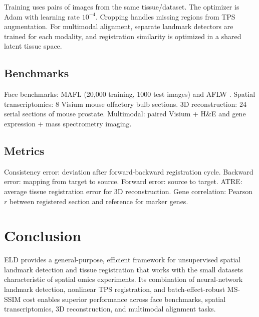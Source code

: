 \documentclass[11pt]{article}
\begin{document}
Training uses pairs of images from the same tissue/dataset. The optimizer is Adam \citep{kingma2014adam} with learning rate $10^{-4}$. Cropping handles missing regions from TPS augmentation. For multimodal alignment, separate landmark detectors are trained for each modality, and registration similarity is optimized in a shared latent tissue space.

\subsection{Benchmarks}

Face benchmarks: MAFL \citep{mafl2015deep} (20,000 training, 1000 test images) and AFLW \citep{koestinger2011aflw}. Spatial transcriptomics: 8 Visium mouse olfactory bulb sections. 3D reconstruction: 24 serial sections of mouse prostate. Multimodal: paired Visium + H\&E and gene expression + mass spectrometry imaging.

\subsection{Metrics}

Consistency error: deviation after forward-backward registration cycle. Backward error: mapping from target to source. Forward error: source to target. ATRE: average tissue registration error for 3D reconstruction. Gene correlation: Pearson $r$ between registered section and reference for marker genes.

\section{Conclusion}

ELD provides a general-purpose, efficient framework for unsupervised spatial landmark detection and tissue registration that works with the small datasets characteristic of spatial omics experiments. Its combination of neural-network landmark detection, nonlinear TPS registration, and batch-effect-robust MS-SSIM cost enables superior performance across face benchmarks, spatial transcriptomics, 3D reconstruction, and multimodal alignment tasks.



\end{document}
